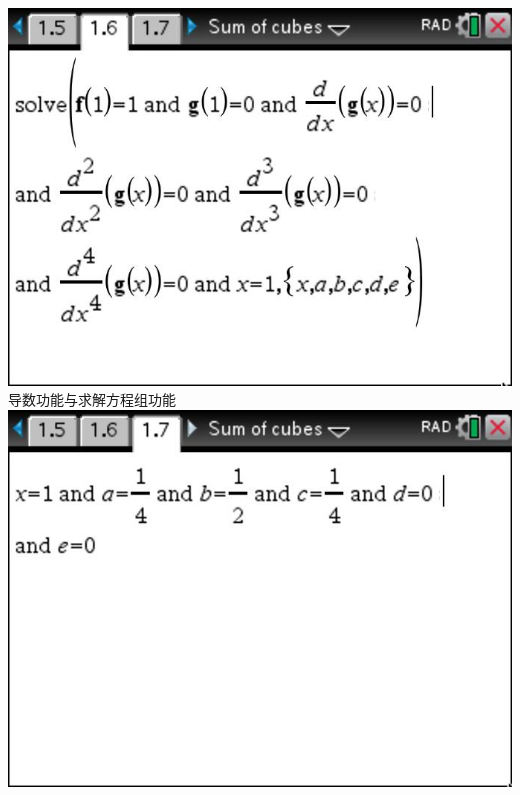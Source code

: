 \documentclass[aspectratio=169]{beamer}
\begin{document}
\begin{frame}
\begin{columns}
       	\includegraphics[scale=0.22]{导数2.jpg}\\
       	\scriptsize {导数功能与求解方程组功能}\\
       	\hspace{1cm}
       	\includegraphics[scale=0.22]{导数3.jpg}\\
       	\scriptsize {\phantom{导数功能与求解方程组功能}}\\
       	\hspace{1cm}
       \end{columns}            
   \end{frame}
\end{document}
